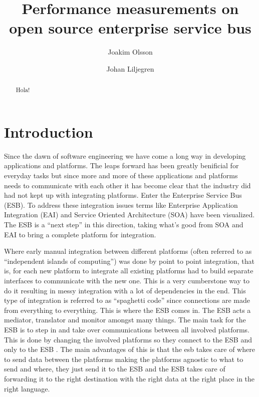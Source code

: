 \documentclass{llncs}
\title{Performance measurements on open source enterprise service bus}
\author{Joakim Olsson \inst{1} \and Johan Liljegren\inst{1}}
\institute{
	Blekinge Institute of Technology \\
	\email{laggmonkei@gmail.com}, \email{datanizze@gmail.com}
}
\begin{document}
\maketitle
\begin{abstract}
Hola!
\end{abstract}

\section{Introduction} %

Since the dawn of software engineering we have come a long way in developing applications and platforms. The leaps forward has been greatly benificial for everyday tasks but since more and more of these applications and platforms needs to communicate with each other it has become clear that the industry did had not kept up with integrating platforms. Enter the Enterprise Service Bus (ESB). To address these integration issues terms like Enterprise Application Integration (EAI) and Service Oriented Architecture (SOA) have been visualized. The ESB is a ``next step'' in this direction, taking what's good from SOA and EAI to bring a complete platform for integration.

Where early manual integration between different platforms (often referred to as ``independent islands of computing'') was done by point to point integration, that is, for each new platform to integrate all existing platforms had to build separate interfaces to communicate with the new one. This is a very cumberstone way to do it resulting in messy integration with a lot of dependencies in the end. This type of integration is referred to as ``spaghetti code'' since connections are made from everything to everything. This is where the ESB comes in. The ESB acts a mediator, translator and monitor amongst many things. The main task for the ESB is to step in and take over communications between all involved platforms. This is done by changing the involved platforms so they connect to the ESB and only to the ESB \cite{ESBthesis}. The main advantages of this is that the esb takes care of where to send data between the platforms making the platforms agnostic to what to send and where, they just send it to the ESB and the ESB takes care of forwarding it to the right destination with the right data at the right place in the right language.
\end{document}
